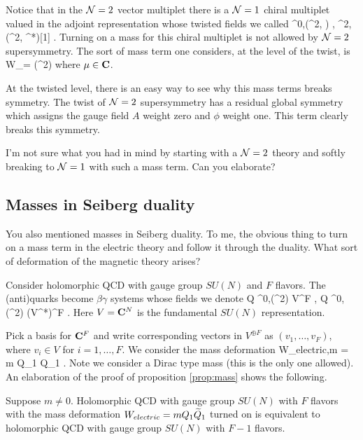 \documentclass[11pt]{amsart}
\renewcommand{\op}{\operatorname}
\begin{document}
Notice that in the $\mathcal N=2$ vector multiplet there is a $\mathcal N=1$ chiral multiplet valued in the adjoint representation whose twisted fields we called 
\beqn
\phi \in \Omega^{0,\bu}(\C^2, ) , \quad \psi \in \Omega^{2,\bu}(\C^2, ^*)[1] .
\eeqn
Turning on a mass for this chiral multiplet is not allowed by $\mathcal N=2$ supersymmetry.
The sort of mass term one considers, at the level of the twist, is
\beqn
W_\mu = \mu \op{Tr}(\phi^2) 
\eeqn
where $\mu \in \mathbf{C}$.

At the twisted level, there is an easy way to see why this mass terms breaks symmetry.
The twist of $\mathcal N=2$ supersymmetry has a residual global symmetry which assigns the gauge field $A$ weight zero and $\phi$ weight one.
This term clearly breaks this symmetry.

I'm not sure what you had in mind by starting with a $\mathcal N=2$ theory and softly breaking to $\mathcal N=1$ with such a mass term. Can you elaborate?

\subsection{Masses in Seiberg duality}

You also mentioned masses in Seiberg duality.
To me, the obvious thing to turn on a mass term in the electric theory and follow it through the duality.
What sort of deformation of the magnetic theory arises?

Consider holomorphic QCD with gauge group $SU(N)$ and $F$ flavors.
The (anti)quarks become $\beta\gamma$ systems whose fields we denote
\beqn
Q \in \Omega^{0,\bu}(\C^2) \otimes V^{\oplus F} , \quad \til Q \in \Omega^{0,\bu}(\C^2) \otimes (V^*)^{\oplus F} .
\eeqn
Here $V = \mathbf{C}^N$ is the fundamental $SU(N)$ representation.

Pick a basis for $\mathbf{C}^F$ and write corresponding vectors in $V^{\oplus F}$ as $(v_1,\ldots,v_F)$, where $v_i \in V$ for $i=1,\ldots,F$.
We consider the mass deformation
\beqn
W_{electric,m} = m Q_1 \til Q_1 .
\eeqn
Note we consider a Dirac type mass (this is the only one allowed).
An elaboration of the proof of proposition \ref{prop:mass} shows the following.

\begin{prop}
Suppose $m \ne 0$.
Holomorphic QCD with gauge group $SU(N)$ with $F$ flavors with the mass deformation $W_{electric} = m Q_1 \widetilde Q_1$ turned on is equivalent to holomorphic QCD with gauge group $SU(N)$ with $F-1$ flavors.
\end{prop}
\end{document}
